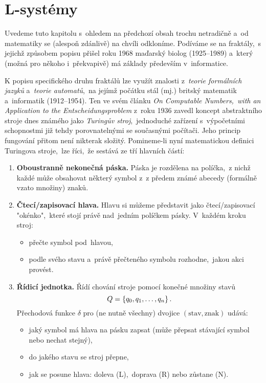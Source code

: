 \section{L-systémy}\label{sec:L-systemy}

Uvedeme tuto kapitolu s~ohledem na předchozí obsah trochu netradičně a~od matematiky se (alespoň zdánlivě) na chvíli odkloníme. Podíváme se na fraktály,~s jejichž způsobem popisu přišel roku 1968 maďarský biolog  (1925--1989) a~který (možná pro někoho i~překvapivě) má základy především v~informatice. \citep[str. 2]{Prusinkiewicz1990}

K popisu specifického druhu fraktálů lze využít znalosti z~\emph{teorie formálních jazyků} a~\emph{teorie automatů},~na jejímž počátku stál (mj.) britský matematik a~informatik  (1912--1954). Ten ve svém článku \emph{On Computable Numbers,~with an Application to the Entscheidungsproblem} z~roku 1936 zavedl koncept abstraktního stroje dnes známého jako \emph{Turingův stroj},~jednoduché zařízení s~výpočetními schopnostmi již tehdy porovnatelnými se současnými počítači. Jeho princip fungování přitom není nikterak složitý. Pomineme-li nyní matematickou definici Turingova stroje,~lze říci,~že sestává ze tří hlavních částí:
\begin{enumerate}
    \item \textbf{Oboustranně nekonečná páska.} Páska je rozdělena na políčka,~z nichž každé může obsahovat některý symbol z~z předem známé abecedy (formálně vzato množiny) znaků.
    \item \textbf{Čtecí/zapisovací hlava.} Hlavu si můžeme představit jako čtecí/zapisovací "okénko",~které stojí právě nad~jedním políčkem pásky. V~každém kroku stroj:
    \begin{itemize}
        \item přečte symbol pod~hlavou,
        \item podle svého stavu a~právě přečteného symbolu rozhodne,~jakou akci provést.
    \end{itemize}
    \item \textbf{Řídicí jednotka.} Řídí chování stroje pomocí konečné množiny stavů
    \[Q=\left\{q_0,q_1,\ldots,q_n\right\}.\]
    Přechodová funkce $\delta$ pro (ne nutně všechny) dvojice $(\text{stav},\text{znak})$ udává:
    \begin{itemize}
        \item jaký symbol má hlava na pásku zapsat (může přepsat stávající symbol nebo nechat stejný),
        \item do jakého stavu se stroj přepne,
        \item jak se posune hlava: doleva (L),~doprava (R) nebo zůstane (N).
    \end{itemize}    
\end{enumerate}
